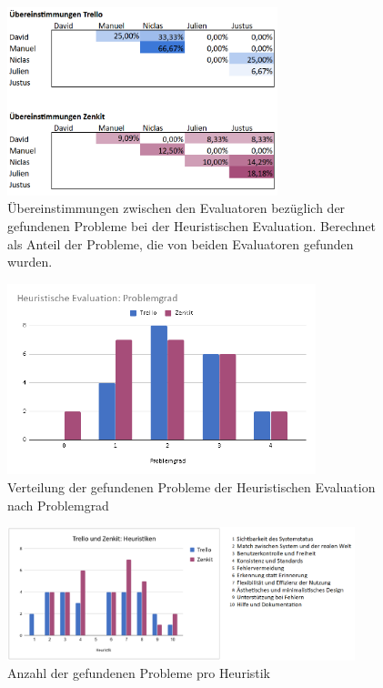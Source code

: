 \begin{figure}[h]
    \includegraphics[width=0.7\textwidth]{images/Statistiken/uebereinstimmungen.PNG}
    \centering
    \caption{Übereinstimmungen zwischen den Evaluatoren bezüglich der gefundenen Probleme bei der Heuristischen Evaluation. Berechnet als Anteil der Probleme, die von beiden Evaluatoren gefunden wurden.}
    \label{fig:uebereinstimmungen}
\end{figure}

\begin{figure}[h]
    \includegraphics[width=0.8\textwidth]{images/Statistiken/problemgrad.png}
    \caption{Verteilung der gefundenen Probleme der Heuristischen Evaluation nach Problemgrad}
    \label{fig:gefundene_probleme}
\end{figure}

\begin{figure}[H]
    \includegraphics[width=0.9\textwidth]{images/Statistiken/probleme_heuristiken_neu.png}
    \centering
    \caption{Anzahl der gefundenen Probleme pro Heuristik}
    \label{fig:heuristik_probleme}
\end{figure}

